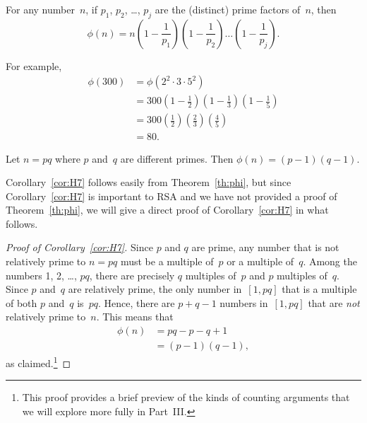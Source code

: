 \begin{theorem}\label{th:phi}
For any number~$n$, if $p_1$, $p_2$, \dots, $p_j$ are the (distinct)
prime factors of~$n$, then
\begin{equation*}
    \phi(n) = n \left(1 - \frac{1}{p_1}\right)
                \left(1 - \frac{1}{p_2}\right)
                \dots
                \left(1 - \frac{1}{p_j}\right).
\end{equation*}
\end{theorem}
For example,
\begin{align*}
\phi(300)
    & = \phi(2^2 \cdot 3 \cdot 5^2) \\
    & = 300 \left(1 - \frac{1}{2}\right)
            \left(1 - \frac{1}{3}\right)
            \left(1 - \frac{1}{5}\right) \\
    & = 300 \left(\frac{1}{2}\right)
            \left(\frac{2}{3}\right)
            \left(\frac{4}{5}\right) \\
    & = 80.
\end{align*}

\begin{corollary}\label{cor:H7}
Let $n = pq$ where $p$ and~$q$ are different primes.  Then $\phi(n) =
(p-1) (q-1)$.
\end{corollary}

Corollary~\ref{cor:H7} follows easily from
Theorem~\ref{th:phi}, but since Corollary~\ref{cor:H7} is important to
RSA and we have not provided a proof of Theorem~\ref{th:phi}, we will
give a direct proof of Corollary~\ref{cor:H7} in what follows.

\begin{proof}[Proof of Corollary~\ref{cor:H7}]

Since $p$ and $q$ are prime, any number that is not relatively prime
to $n = pq$ must be a multiple of~$p$ or a multiple of~$q$.  Among the
numbers 1, 2, \ldots, $pq$, there are precisely $q$ multiples
of~$p$ and $p$ multiples of~$q$.  Since $p$ and~$q$ are relatively
prime, the only number in~$[1, pq]$ that is a multiple of both $p$
and~$q$ is~$pq$.  Hence, there are $p + q - 1$ numbers in~$[1, pq]$
that are \emph{not} relatively prime to~$n$.  This means that
\begin{align*}
    \phi(n) & = pq - p - q +1 \\
            & = (p - 1) (q - 1),
\end{align*}
as claimed.\footnote{This proof provides a brief preview of the
  kinds of counting arguments that we will explore more fully in
  Part~III.}
\end{proof}

